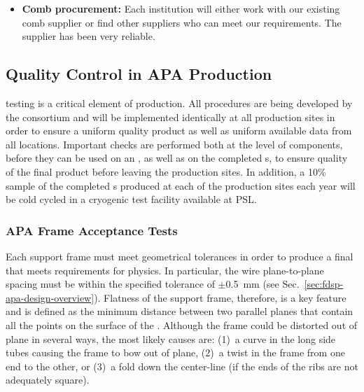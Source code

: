 \begin{itemize}
\item {\bf Comb procurement:} Each institution will either work with our existing comb supplier or find other suppliers who can meet our requirements. The  supplier has been very reliable.

\end{itemize}


\subsection{Quality Control in APA Production}
\label{sec:fdsp-apa-prod-qc}


 testing is a critical element of  production.  All  procedures are being developed by the consortium and will be implemented identically at all production sites in order to ensure a uniform quality product as well as uniform available data from all locations.  Important  checks are performed both at the level of components, before they can be used on an , as well as on the completed s, to ensure quality of the final product before leaving the production sites.  In addition, a 10\% sample of the completed s produced at each of the production sites each year will be cold cycled in a cryogenic test facility available at PSL.

\subsubsection{APA Frame Acceptance Tests} 

Each  support frame must meet geometrical tolerances in order to produce a final  that meets requirements for physics. In particular, the wire plane-to-plane spacing must be within the specified tolerance of $\pm$\SI{0.5}{mm} (see Sec.~\ref{sec:fdsp-apa-design-overview}).  Flatness of the support frame, therefore, is a key feature and is defined as the minimum distance between two parallel planes that contain all the points on the surface of the .  Although %
the frame could be distorted out of plane in several ways, the most likely causes are: %
(1)~a curve in the long side tubes causing the frame to bow out of plane, (2)~a twist in the frame from one end to the other, or (3)~a fold down the center-line (if the ends of the ribs are not adequately square).

